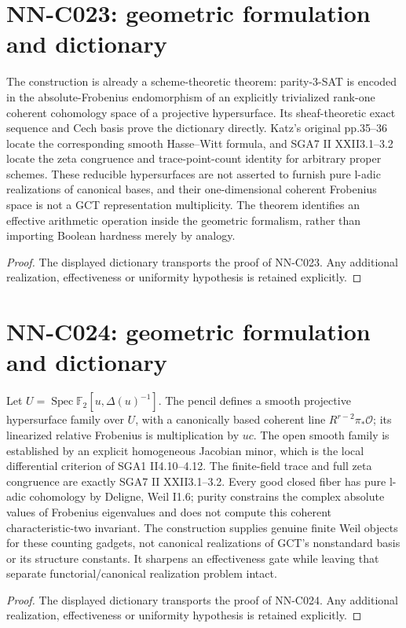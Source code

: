 \section{NN-C023: geometric formulation and dictionary}
\begin{geometricstatement}[NN-C023]
The construction is already a scheme-theoretic theorem: parity-3-SAT is encoded in the absolute-Frobenius endomorphism of an explicitly trivialized rank-one coherent cohomology space of a projective hypersurface. Its sheaf-theoretic exact sequence and Cech basis prove the dictionary directly. Katz's original pp.35--36 locate the corresponding smooth Hasse--Witt formula, and SGA7 II XXII3.1--3.2 locate the zeta congruence and trace-point-count identity for arbitrary proper schemes. These reducible hypersurfaces are not asserted to furnish pure l-adic realizations of canonical bases, and their one-dimensional coherent Frobenius space is not a GCT representation multiplicity. The theorem identifies an effective arithmetic operation inside the geometric formalism, rather than importing Boolean hardness merely by analogy.
\end{geometricstatement}
\begin{proof} The displayed dictionary transports the proof of NN-C023. Any additional realization, effectiveness or uniformity hypothesis is retained explicitly.\end{proof}


\section{NN-C024: geometric formulation and dictionary}
\begin{geometricstatement}[NN-C024]
Let $U=\operatorname{Spec}\mathbb F_2[u,\Delta(u)^{-1}]$. The pencil defines a smooth projective hypersurface family over $U$, with a canonically based coherent line $R^{r-2}\pi_*\mathcal O$; its linearized relative Frobenius is multiplication by $uc$. The open smooth family is established by an explicit homogeneous Jacobian minor, which is the local differential criterion of SGA1 II4.10--4.12. The finite-field trace and full zeta congruence are exactly SGA7 II XXII3.1--3.2. Every good closed fiber has pure l-adic cohomology by Deligne, Weil I1.6; purity constrains the complex absolute values of Frobenius eigenvalues and does not compute this coherent characteristic-two invariant. The construction supplies genuine finite Weil objects for these counting gadgets, not canonical realizations of GCT's nonstandard basis or its structure constants. It sharpens an effectiveness gate while leaving that separate functorial/canonical realization problem intact.
\end{geometricstatement}
\begin{proof} The displayed dictionary transports the proof of NN-C024. Any additional realization, effectiveness or uniformity hypothesis is retained explicitly.\end{proof}


